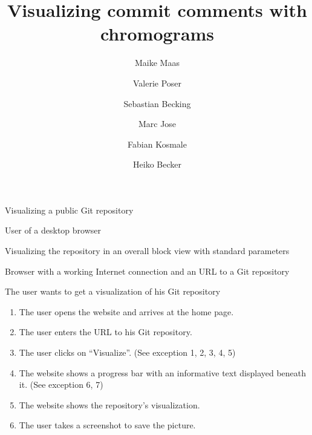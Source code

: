\documentclass[11pt]{scrartcl}
\author{Maike Maas \and Valerie Poser \and Sebastian Becking \and
        Marc Jose \and Fabian Kosmale \and Heiko Becker}
\title{Visualizing commit comments with chromograms}
\begin{document}
\maketitle

\begin{description}[leftmargin=!,labelwidth=\widthof{\bfseries Frequency of use:}]
	\item[Use-case:] Visualizing a public Git repository 
	\item[Primary actor:] User of a desktop browser 
	\item[Goal in context:] Visualizing the repository in an overall block view with standard parameters 
	\item[Preconditions:] Browser with a working Internet connection and an URL to a Git repository
	\item[Trigger:] The user wants to get a visualization of his Git repository 

	\item[Scenario:]
		\begin{enumerate}[leftmargin=1.5em]
			\item The user opens the website and arrives at the home page.
			\item The user enters the URL to his Git repository. 
			\item The user clicks on \enquote{Visualize}. (See exception 1, 2, 3, 4, 5)
			\item The website shows a progress bar with an
				informative text displayed beneath
				it. (See exception 6, 7)
			\item The website shows the repository's visualization.
			\item The user takes a screenshot to save the picture. 
		\end{enumerate}


\end{description}
\end{document}
